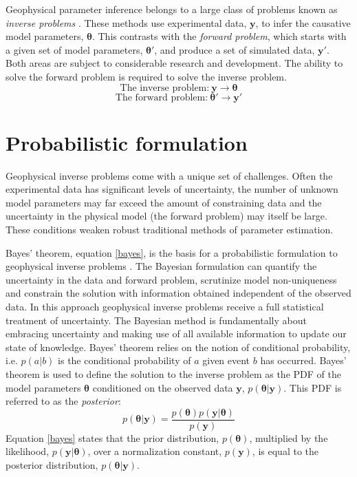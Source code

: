 Geophysical parameter inference belongs to a large class of problems known as \textit{inverse problems} \citep{Tarantola2005,Aster2013,Menke2012}. These methods use experimental data, $\bm{y}$, to infer the causative model parameters, $\bm{\theta}$. This contrasts with the \textit{forward problem}, which starts with a given set of model parameters, $\bm{\theta'}$, and produce a set of simulated data, $\bm{y'}$. Both areas are subject to considerable research and development. The ability to solve the forward problem is required to solve the inverse problem.
\begin{equation}
\text{The inverse problem:}\ \bm{y} \rightarrow \bm{\theta}
\label{inverse_problem}
\end{equation}
\begin{equation}
\text{The forward problem:}\ \bm{\theta'} \rightarrow \bm{y'}
\label{forward_problem}
\end{equation}


\section{Probabilistic formulation}

Geophysical inverse problems come with a unique set of challenges. Often the experimental data has significant levels of uncertainty, the number of unknown model parameters may far exceed the amount of constraining data and the uncertainty in the physical model (the forward problem) may itself be large. These conditions weaken robust traditional methods of parameter estimation.\par

Bayes' theorem, equation \ref{bayes}, is the basis for a probabilistic formulation to geophysical inverse problems \citep{Tarantola1982a,Mosegaard1995,Mosegaard2002,Tarantola2005}. The Bayesian formulation can quantify the uncertainty in the data and forward problem, scrutinize model non-uniqueness and constrain the solution with information obtained independent of the observed data. In this approach geophysical inverse problems receive a full statistical treatment of uncertainty. The Bayesian method is fundamentally about embracing uncertainty and making use of all available information to update our state of knowledge. Bayes' theorem relies on the notion of conditional probability, i.e. $p(a|b)$ is the conditional probability of $a$ given event $b$ has occurred. Bayes' theorem is used to define the solution to the inverse problem as the PDF of the model parameters $\bm{\theta}$ conditioned on the observed data $\bm{y}$, $p(\bm{\theta}|\bm{y})$. This PDF is referred to as the \textit{posterior}:
\begin{equation}
p(\bm{\theta}|\bm{y}) = \frac{p(\bm{\theta}) p(\bm{y}|\bm{\theta})}{p(\bm{y})}
\label{bayes}
\end{equation}
Equation \ref{bayes} states that the prior distribution, $p(\bm{\theta})$, multiplied by the likelihood, $p(\bm{y}|\bm{\theta})$, over a normalization constant, $p(\bm{y})$, is equal to the posterior distribution, $p(\bm{\theta}|\bm{y})$.\par

